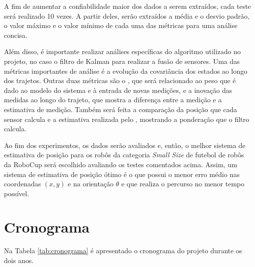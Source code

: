 \documentclass[acronym, symbols, table]{fei}
\begin{document}
		A fim de aumentar a confiabilidade maior dos dados a serem extraídos, cada teste será realizado 10 vezes. A partir deles, serão extraídos a média e o desvio padrão, o valor máximo e o valor mínimo de cada uma das métricas para uma análise concisa.
		
		Além disso, é importante realizar análises específicas do algoritmo utilizado no projeto, no caso o filtro de Kalman para realizar a fusão de sensores. Uma das métricas importantes de análise é a evolução da covariância dos estados ao longo dos trajetos. Outras duas métricas são o , que será relacionado ao peso que é dado ao modelo do sistema e à entrada de novas medições, e a inovação das medidas ao longo do trajeto, que mostra a diferença entre a medição e a estimativa de medição. Também será feita a comparação da posição que cada sensor calcula e a estimativa realizada pelo , mostrando a ponderação que o filtro calcula.
		
		Ao fim dos experimentos, os dados serão avaliados e, então, o melhor sistema de estimativa de posição para os robôs da categoria \textit{Small Size} de futebol de robôs da RoboCup será escolhido avaliando os testes comentados acima. Assim, um sistema de estimativa de posição ótimo é o que possui o menor erro médio nas coordenadas $(x, y)$ e na orientação $\theta$ e que realiza o percurso no menor tempo possível.
		
	\chapter{Cronograma}\label{sec:cronograma}
	
		\newcommand{\X}{\cellcolor{grey}}
		
		Na Tabela \ref{tab:cronograma} é apresentado o cronograma do projeto durante os dois anos.
		
\end{document}

